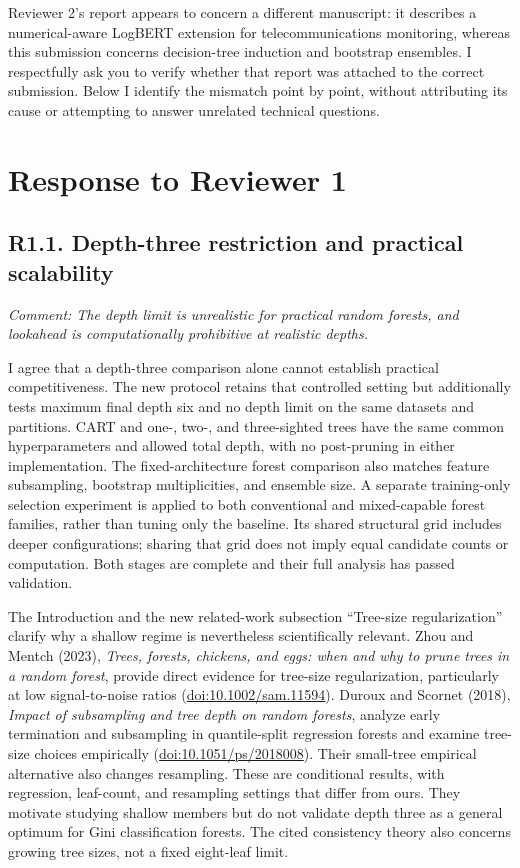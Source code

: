 \documentclass[11pt]{article}
\newcommand{\comment}[1]{\textit{Comment: #1}}
\begin{document}
Reviewer 2's report appears to concern a different manuscript: it describes a numerical-aware LogBERT extension for telecommunications monitoring, whereas this submission concerns decision-tree induction and bootstrap ensembles. I respectfully ask you to verify whether that report was attached to the correct submission. Below I identify the mismatch point by point, without attributing its cause or attempting to answer unrelated technical questions.

\section*{Response to Reviewer 1}
\subsection*{R1.1. Depth-three restriction and practical scalability}
\comment{The depth limit is unrealistic for practical random forests, and lookahead is computationally prohibitive at realistic depths.}

I agree that a depth-three comparison alone cannot establish practical competitiveness. The new protocol retains that controlled setting but additionally tests maximum final depth six and no depth limit on the same datasets and partitions. CART and one-, two-, and three-sighted trees have the same common hyperparameters and allowed total depth, with no post-pruning in either implementation. The fixed-architecture forest comparison also matches feature subsampling, bootstrap multiplicities, and ensemble size. A separate training-only selection experiment is applied to both conventional and mixed-capable forest families, rather than tuning only the baseline. Its shared structural grid includes deeper configurations; sharing that grid does not imply equal candidate counts or computation. Both stages are complete and their full analysis has passed validation.

The Introduction and the new related-work subsection ``Tree-size regularization'' clarify why a shallow regime is nevertheless scientifically relevant. Zhou and Mentch (2023), \emph{Trees, forests, chickens, and eggs: when and why to prune trees in a random forest}, provide direct evidence for tree-size regularization, particularly at low signal-to-noise ratios (\href{https://doi.org/10.1002/sam.11594}{doi:10.1002/sam.11594}). Duroux and Scornet (2018), \emph{Impact of subsampling and tree depth on random forests}, analyze early termination and subsampling in quantile-split regression forests and examine tree-size choices empirically (\href{https://doi.org/10.1051/ps/2018008}{doi:10.1051/ps/2018008}). Their small-tree empirical alternative also changes resampling. These are conditional results, with regression, leaf-count, and resampling settings that differ from ours. They motivate studying shallow members but do not validate depth three as a general optimum for Gini classification forests. The cited consistency theory also concerns growing tree sizes, not a fixed eight-leaf limit.
\end{document}
